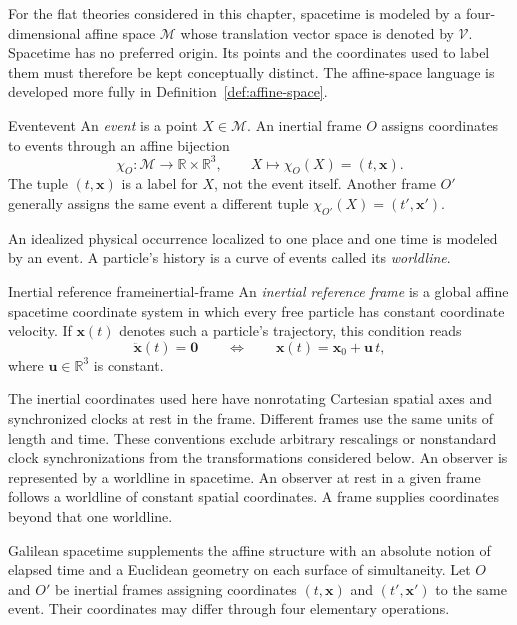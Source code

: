 \documentclass[11pt,a4paper]{article}
\newcommand{\vect}[1]{\bm{#1}}
\newcommand{\R}{\mathbb{R}}
\begin{document}
For the flat theories considered in this chapter, spacetime is modeled by a
four-dimensional affine space \(\mathcal M\) whose translation vector space is
denoted by \(\mathcal V\). Spacetime has no preferred origin. Its points and the
coordinates used to label them must therefore be kept conceptually distinct.
The affine-space language is developed more fully in
Definition~\ref{def:affine-space}.

\begin{definition}{Event}{event}
An \emph{event} is a point \(X\in\mathcal M\). An inertial frame \(O\)
assigns coordinates to events through an affine bijection
\[
  \chi_O:\mathcal M\longrightarrow\R\times\R^3,
  \qquad
  X\longmapsto\chi_O(X)=(t,\vect{x}).
\]
The tuple \((t,\vect{x})\) is a label for \(X\), not the event itself. Another
frame \(O'\) generally assigns the same event a different tuple
\(\chi_{O'}(X)=(t',\vect{x}')\).
\end{definition}

An idealized physical occurrence localized to one place and one time is
modeled by an event. A particle's history is a curve of events called its
\emph{worldline}.

\begin{definition}{Inertial reference frame}{inertial-frame}
An \emph{inertial reference frame} is a global affine spacetime coordinate
system in which every free particle has constant coordinate velocity. If
\(\vect{x}(t)\) denotes such a particle's trajectory, this condition reads
\[
  \ddot{\vect{x}}(t)=\vect{0}
  \qquad\Longleftrightarrow\qquad
  \vect{x}(t)=\vect{x}_0+\vect{u}\,t,
\]
where \(\vect{u}\in\R^3\) is constant.
\end{definition}

The inertial coordinates used here have nonrotating Cartesian spatial axes
and synchronized clocks at rest in the frame. Different frames use the same
units of length and time. These conventions exclude arbitrary rescalings or
nonstandard clock synchronizations from the transformations considered below.
An observer is represented by a worldline in spacetime. An observer at rest
in a given frame follows a worldline of constant spatial coordinates. A frame
supplies coordinates beyond that one worldline.

Galilean spacetime supplements the affine structure with an absolute notion of
elapsed time and a Euclidean geometry on each surface of simultaneity. Let
\(O\) and \(O'\) be inertial frames assigning coordinates
\((t,\vect{x})\) and \((t',\vect{x}')\) to the same event. Their coordinates
may differ through four elementary operations.
\end{document}
